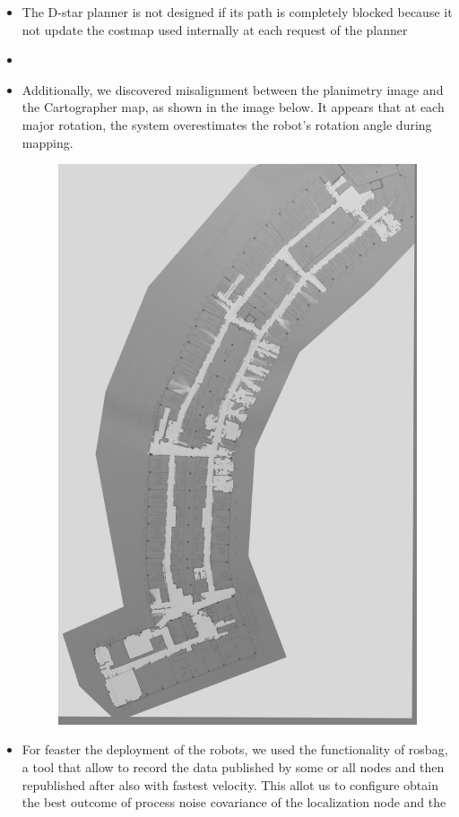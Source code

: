 \begin{itemize}
\item The D-star planner is not designed if its path is completely blocked because it not update the costmap used internally at each request of the planner

\item {}

\item Additionally, we discovered misalignment between the planimetry image and the Cartographer map, as shown in the image below. It appears that at each major rotation, the system overestimates the robot’s rotation angle during mapping.

\begin{figure}[h]
	\centering
	\includegraphics[width=0.7\linewidth]{img/mapComposizione.png}
\end{figure}

\item For feaster the deployment of the robots, we used the  functionality of rosbag, a tool that allow to record the data published by some or all nodes and then republished after also with fastest velocity. This allot us to configure obtain the best outcome of process noise covariance of the localization node and the


\end{itemize}
